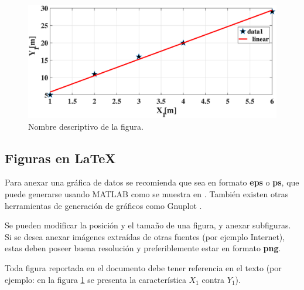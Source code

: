 \documentclass[journal]{IEEEtran}
\begin{document}
\begin{figure}[H] %
\centering  %
\includegraphics[scale=0.23]{fig} %
\caption{Nombre descriptivo de la figura.} %
\label{lvdt4} %
\end{figure}

\subsection{Figuras en \LaTeX}
Para anexar una gráfica de datos se recomienda que sea en formato \textbf{eps} o \textbf{ps}, que puede generarse usando MATLAB como se muestra en \cite{imagenes}. También existen otras herramientas de generación de gráficos como Gnuplot \cite{GNUp}.

Se pueden modificar la posición y el tamaño de una figura, y anexar subfiguras. Si se desea anexar imágenes extraídas de otras fuentes (por ejemplo Internet), estas deben poseer buena resolución y preferiblemente estar en formato \textbf{png}.

Toda figura reportada en el documento debe tener referencia en el texto (por ejemplo: en la figura \ref{lvdt4} se presenta la característica $X_1$ contra $Y_1$).
\end{document}
